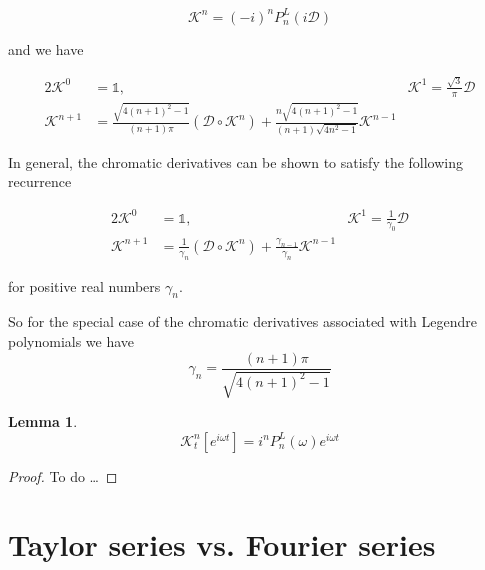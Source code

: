 \documentclass[11pt]{article}
\theoremstyle{plain}
\newtheorem{lemma}[theorem]{Lemma}
\theoremstyle{definition}
\theoremstyle{remark}
\begin{document}
\begin{equation}
	\mathcal{K}^n = (-i)^n P_n^L \left (i \mathcal{D} \right )
\end{equation}

and we have 

\begin{alignat*}{2}
\mathcal{K}^0 		&= \mathds{1}, & \mathcal{K}^1 = \frac{\sqrt{3}}{\pi} \mathcal{D} \\
\mathcal{K}^{n+1} &= \frac{\sqrt{4(n+1)^2-1}}{(n+1) \pi} \left ( \mathcal{D} \circ \mathcal{K}^n \right ) 
											+ \frac{n\sqrt{4(n+1)^2-1}}{(n+1)\sqrt{4n^2-1}} \mathcal{K}^{n-1}
\end{alignat*}

In general, the chromatic derivatives can be shown to satisfy the following recurrence

\begin{alignat*}{2}
\mathcal{K}^0 		&= \mathds{1}, & \mathcal{K}^1 = \frac{1}{\gamma_0} \mathcal{D} \\
\mathcal{K}^{n+1} &= \frac{1}{\gamma_n} \left ( \mathcal{D} \circ \mathcal{K}^n \right ) 
											+ \frac{\gamma_{n-1}}{\gamma_n} \mathcal{K}^{n-1}
\end{alignat*}

for positive real numbers $\gamma_n$.

So for the special case of the chromatic derivatives associated with Legendre polynomials
we have
\begin{equation}
	\gamma_n = \frac{(n+1) \pi}{\sqrt{4(n+1)^2-1}}
\end{equation}

\begin{lemma}
\begin{equation*}
	\mathcal{K}_t^n[e^{i\omega t}] = i^n P_n^L(\omega) e^{i\omega t}
\end{equation*}
\end{lemma}

\begin{proof}
To do \dots
\end{proof}

\section{Taylor series vs. Fourier series}
\end{document}
